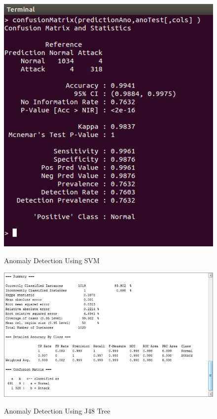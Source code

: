 \documentclass{article}
\begin{document}
\begin{figure}
  \begin{center}
    \includegraphics[scale=0.8]{Anomaly_SVM_cropped.png}
    \label{Anomaly Detection Using SVM}
    \caption{Anomaly Detection Using SVM}
  \end{center}
\end{figure}


\begin{figure}
  \begin{center}
    \includegraphics{Anomaly_J48_cropped.png}
    \label{Anomaly Detection Using J48 Tree}
    \caption{Anomaly Detection Using J48 Tree}
  \end{center}
\end{figure}
\end{document}

